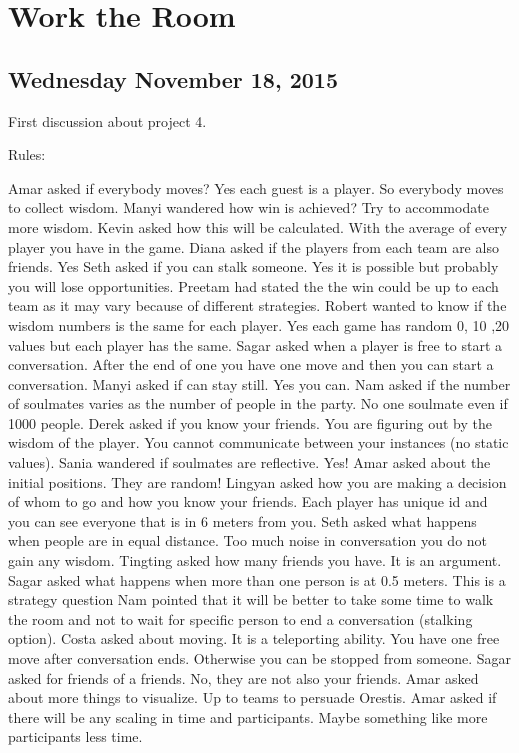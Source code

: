 \section{Work the Room}
\subsection{Wednesday November 18, 2015}
First discussion about project 4.

Rules:

Amar asked if everybody moves? Yes each guest is a player. So everybody moves to collect wisdom.
Manyi wandered how win is achieved? Try to accommodate more wisdom.
Kevin asked how this will be calculated. With the average of every player you have in the game.
Diana asked if the players from each team are also friends. Yes
Seth asked if you can stalk someone. Yes it is possible but probably you will lose opportunities.
Preetam had stated the the win could be up to each team as it may vary because of different strategies.
Robert wanted to know if the wisdom numbers is the same for each player. Yes each game has random {0, 10 ,20} values but each player has the same.
Sagar asked when a player is free to start a conversation. After the end of one you have one move and then you can start a conversation.
Manyi asked if can stay still. Yes you can.
Nam asked if the number of soulmates varies as the number of people in the party. No one soulmate even if 1000 people.
Derek asked if you know your friends. You are figuring out by the wisdom of the player. You cannot communicate between your instances (no static values). 
Sania wandered if soulmates are reflective. Yes!
Amar asked about the initial positions. They are random!
Lingyan asked how you are making a decision of whom to go and how you know your friends.
Each player has unique id and you can see everyone that is in 6 meters from you.
Seth asked what happens when people are in equal distance. Too much noise in conversation you do not gain any wisdom. 
Tingting asked how many friends you have. It is an argument.
Sagar asked what happens when more than one person is at 0.5 meters. This is a strategy question
Nam pointed that it will be better to take some time to walk the room and not to wait for specific person to end a conversation (stalking option).
Costa asked about moving. It is a teleporting ability. You have one free move after conversation ends. Otherwise you can be stopped from someone. 
Sagar asked for friends of a friends. No, they are not also your friends.
Amar asked about more things to visualize. Up to teams to persuade Orestis.
Amar asked if there will be any scaling in time and participants. Maybe something like more participants less time.

